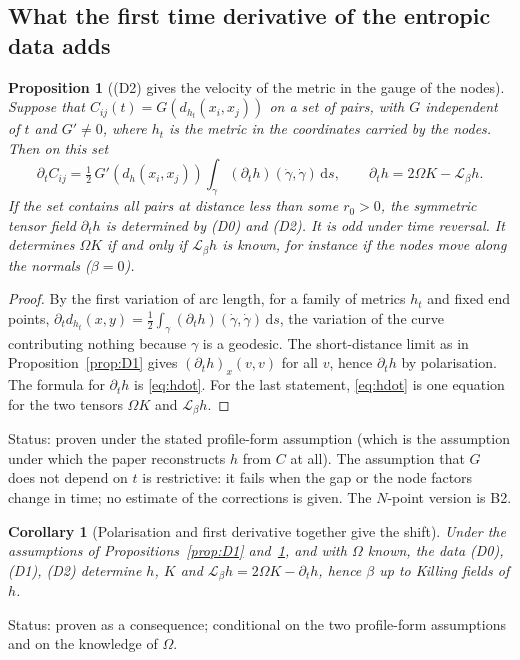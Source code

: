 \documentclass[a4paper,11pt]{article}
\newtheorem{proposition}[theorem]{Proposition}
\newtheorem{corollary}[theorem]{Corollary}
\theoremstyle{definition}
\theoremstyle{remark}
\newcommand{\dd}{\mathrm{d}}
\newcommand{\Lie}{\mathcal{L}}
\newcommand{\status}[1]{\par\noindent\textsf{\small Status: #1}\par}
\begin{document}
\subsection{What the first time derivative of the entropic data adds}

\begin{proposition}[\textup{(D2)} gives the velocity of the metric in the gauge of the nodes]\label{prop:D2}
Suppose that $C_{ij}(t)=G(d_{h_t}(x_i,x_j))$ on a set of pairs, with $G$ independent of $t$ and $G'\ne0$, where $h_t$ is the metric in the coordinates carried by the nodes. Then on this set
\begin{equation}\label{eq:Cdot}
\partial_tC_{ij}=\tfrac12\,G'(d_h(x_i,x_j))\int_\gamma(\partial_th)(\dot\gamma,\dot\gamma)\,\dd s,\qquad\partial_th=2\Omega K-\Lie_\beta h .
\end{equation}
If the set contains all pairs at distance less than some $r_0>0$, the symmetric tensor field $\partial_th$ is determined by \textup{(D0)} and \textup{(D2)}. It is odd under time reversal. It determines $\Omega K$ if and only if $\Lie_\beta h$ is known, for instance if the nodes move along the normals ($\beta=0$).
\end{proposition}

\begin{proof}
By the first variation of arc length, for a family of metrics $h_t$ and fixed end points, $\partial_td_{h_t}(x,y)=\tfrac12\int_\gamma(\partial_th)(\dot\gamma,\dot\gamma)\,\dd s$, the variation of the curve contributing nothing because $\gamma$ is a geodesic. The short-distance limit as in Proposition~\ref{prop:D1} gives $(\partial_th)_x(v,v)$ for all $v$, hence $\partial_th$ by polarisation. The formula for $\partial_th$ is \eqref{eq:hdot}. For the last statement, \eqref{eq:hdot} is one equation for the two tensors $\Omega K$ and $\Lie_\beta h$.
\end{proof}
\status{proven under the stated profile-form assumption (which is the assumption under which the paper reconstructs $h$ from $C$ at all). The assumption that $G$ does not depend on $t$ is restrictive: it fails when the gap or the node factors change in time; no estimate of the corrections is given. The $N$-point version is B2.}

\begin{corollary}[Polarisation and first derivative together give the shift]\label{cor:shift}
Under the assumptions of Propositions~\ref{prop:D1} and~\ref{prop:D2}, and with $\Omega$ known, the data \textup{(D0)}, \textup{(D1)}, \textup{(D2)} determine $h$, $K$ and $\Lie_\beta h=2\Omega K-\partial_th$, hence $\beta$ up to Killing fields of $h$.
\end{corollary}
\status{proven as a consequence; conditional on the two profile-form assumptions and on the knowledge of $\Omega$.}
\end{document}
